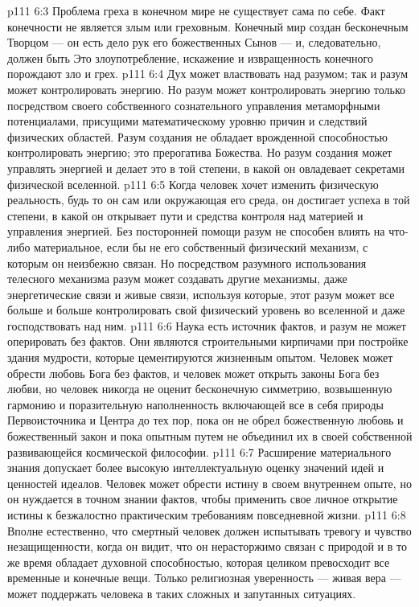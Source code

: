 \vs p111 6:3 \pc Проблема греха в конечном мире не существует сама по себе. Факт конечности не является злым или греховным. Конечный мир создан бесконечным Творцом --- он есть дело рук его божественных Сынов --- и, следовательно, должен быть  Это злоупотребление, искажение и извращенность конечного порождают зло и грех.
\vs p111 6:4 \pc Дух может властвовать над разумом; так и разум может контролировать энергию. Но разум может контролировать энергию только посредством своего собственного сознательного управления метаморфными потенциалами, присущими математическому уровню причин и следствий физических областей. Разум создания не обладает врожденной способностью контролировать энергию; это прерогатива Божества. Но разум создания может управлять энергией и делает это в той степени, в какой он овладевает секретами физической вселенной.
\vs p111 6:5 Когда человек хочет изменить физическую реальность, будь то он сам или окружающая его среда, он достигает успеха в той степени, в какой он открывает пути и средства контроля над материей и управления энергией. Без посторонней помощи разум не способен влиять на что\hyp{}либо материальное, если бы не его собственный физический механизм, с которым он неизбежно связан. Но посредством разумного использования телесного механизма разум может создавать другие механизмы, даже энергетические связи и живые связи, используя которые, этот разум может все больше и больше контролировать свой физический уровень во вселенной и даже господствовать над ним.
\vs p111 6:6 Наука есть источник фактов, и разум не может оперировать без фактов. Они являются строительными кирпичами при постройке здания мудрости, которые цементируются жизненным опытом. Человек может обрести любовь Бога без фактов, и человек может открыть законы Бога без любви, но человек никогда не оценит бесконечную симметрию, возвышенную гармонию и поразительную наполненность включающей все в себя природы Первоисточника и Центра до тех пор, пока он не обрел божественную любовь и божественный закон и пока опытным путем не объединил их в своей собственной развивающейся космической философии.
\vs p111 6:7 Расширение материального знания допускает более высокую интеллектуальную оценку значений идей и ценностей идеалов. Человек может обрести истину в своем внутреннем опыте, но он нуждается в точном знании фактов, чтобы применить свое личное открытие истины к безжалостно практическим требованиям повседневной жизни.
\vs p111 6:8 \pc Вполне естественно, что смертный человек должен испытывать тревогу и чувство незащищенности, когда он видит, что он нерасторжимо связан с природой и в то же время обладает духовной способностью, которая целиком превосходит все временные и конечные вещи. Только религиозная уверенность --- живая вера --- может поддержать человека в таких сложных и запутанных ситуациях.
